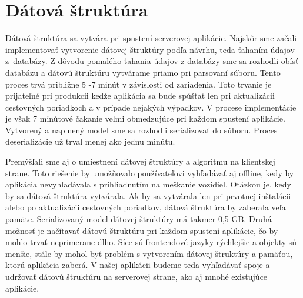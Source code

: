 \section{Dátová štruktúra}
Dátová štruktúra sa vytvára pri spustení serverovej aplikácie. Najskôr sme začali implementovať vytvorenie dátovej štruktúry podľa návrhu, teda ťahaním údajov z~databázy. Z dôvodu pomalého ťahania údajov z databázy sme sa rozhodli obísť databázu a dátovú štruktúru vytvárame priamo pri parsovaní súboru. Tento proces trvá približne 5 -7 minút v závislosti od zariadenia. Toto trvanie je prijateľné pri produkcii keďže aplikácia sa bude spúšťať len pri aktualizácii cestovných poriadkoch a v prípade nejakých výpadkov. V procese implementácie je však 7 minútové čakanie veľmi obmedzujúce pri každom spustení aplikácie. Vytvorený a naplnený model sme sa rozhodli serializovať do súboru. Proces deserializácie už trval menej ako jednu minútu. 

Premýšľali sme aj o umiestnení dátovej štruktúry a algoritmu na klientskej strane. Toto riešenie by umožňovalo používateľovi vyhľadávať aj offline, kedy by aplikácia nevyhľadávala s prihliadnutím na meškanie vozidiel. Otázkou je, kedy by sa dátová štruktúra vytvárala. Ak by sa vytvárala len pri prvotnej inštalácii alebo po aktualizácii cestovných poriadkov, dátová štruktúra by zaberala veľa pamäte. Serializovaný model dátovej štruktúry má takmer 0,5 GB. Druhá možnosť je načítavať dátovú štruktúru pri každom spustení aplikácie, čo by mohlo trvať neprimerane dlho. Síce sú frontendové jazyky rýchlejšie a objekty sú menšie, stále by mohol byť problém s vytvorením dátovej štruktúry a pamäťou, ktorú aplikácia zaberá. V našej aplikácii budeme teda vyhľadávať spoje a udržovať dátovú štruktúru na serverovej strane, ako aj mnohé existujúce aplikácie.

